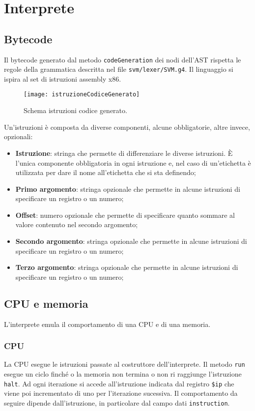 \documentclass[../main.tex]{subfiles}
\begin{document}
\chapter{Interprete}\label{c:interprete}
\section{Bytecode}\label{s:bytecode}
Il bytecode generato dal metodo \verb|codeGeneration| dei nodi dell'AST rispetta le regole della grammatica descritta nel file \verb|svm/lexer/SVM.g4|. Il linguaggio si ispira al set di istruzioni assembly x86. 
\begin{figure}[H]
    \centering
    \texttt{[image: istruzioneCodiceGenerato]}
    \caption{Schema istruzioni codice generato.}
    \label{fig:istruzione-codice-generato}
\end{figure}
Un'istruzioni \`e composta da diverse componenti, alcune obbligatorie, altre invece, opzionali:
\begin{itemize}
    \item \textbf{Istruzione}: stringa che permette di differenziare le diverse istruzioni. \`E l'unica componente obbligatoria in ogni istruzione e, nel caso di un'etichetta \`e utilizzata per dare il nome all'etichetta che si sta definendo;
    \item \textbf{Primo argomento}: stringa opzionale che permette in alcune istruzioni di specificare un registro o un numero;
    \item \textbf{Offset}: numero opzionale che permette di specificare quanto sommare al valore contenuto nel secondo argomento;
    \item \textbf{Secondo argomento}: stringa opzionale che permette in alcune istruzioni di specificare un registro o un numero;
    \item \textbf{Terzo argomento}: stringa opzionale che permette in alcune istruzioni di specificare un registro o un numero;
\end{itemize}
\section{CPU e memoria}\label{s:cpu-e-memoria}
L'interprete emula il comportamento di una CPU e di una memoria.
\subsection{CPU}
La CPU esegue le istruzioni passate al costruttore dell'interprete. Il metodo \verb|run| esegue un ciclo finch\'e o la memoria non termina o non ri raggiunge l'istruzione \verb|halt|. Ad ogni iterazione si accede all'istruzione indicata dal registro \verb|$ip| che viene poi incrementato di uno per l'iterazione sucessiva. Il comportamento da seguire dipende dall'istruzione, in particolare dal campo dati \verb|instruction|.
\end{document}
